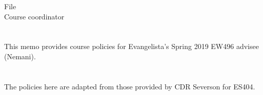 \documentclass[10pt,courier]{navymemo}
\begin{document}
\copyto{}
File\\
Course coordinator


\navyrecordnote
\thispagestyle{empty}


\navyrecordnotesubjline

\section{}  This memo provides course policies for Evangelista's Spring 2019 EW496 advisee (Nemani). 

\section{}  The policies here are adapted from those provided by CDR Severson for ES404.  
\end{document}
